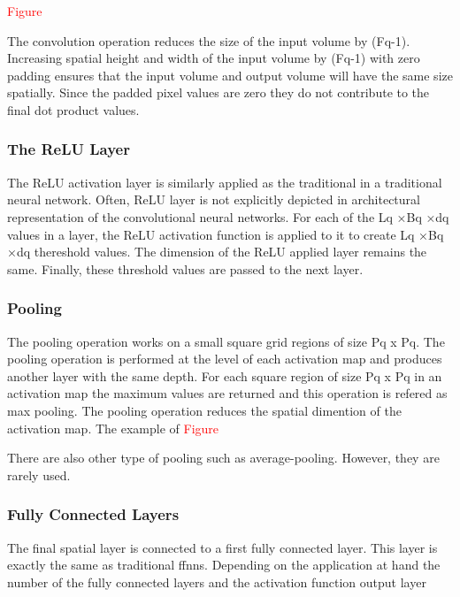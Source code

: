 \textcolor{red}{Figure}

The convolution operation reduces the size of the input volume by (Fq-1). Increasing spatial height and width of the input volume by (Fq-1) with zero padding ensures that the input volume and output volume will have the same size spatially. Since the padded pixel values are zero they do not contribute to the final dot product values. 
\subsubsection{The ReLU Layer}
The ReLU activation layer is similarly applied as the traditional in a traditional neural network. Often, ReLU layer is not explicitly depicted in architectural representation of the convolutional neural networks. For each of the Lq ×Bq ×dq values in a layer, the ReLU activation function is applied to it to create Lq ×Bq ×dq thereshold values. The dimension of the ReLU applied layer remains the same. Finally, these threshold values are passed to the next layer. %
\subsubsection{Pooling}
The pooling operation works on a small square grid regions of size Pq x Pq. The pooling operation is performed at the level of each activation map and produces another layer with the same depth. For each square region of size Pq x Pq in an activation map the maximum values are returned and this operation is refered as max pooling. The pooling operation reduces the spatial dimention of the activation map. The example of
\textcolor{red}{Figure}



There are also other type of pooling such as average-pooling. However, they are rarely used. 
\subsubsection{Fully Connected Layers}
The final spatial layer is connected to a first fully connected layer. This layer is exactly the same as traditional ffnns. Depending on the application at hand the number of the fully connected layers and the activation function output layer  


